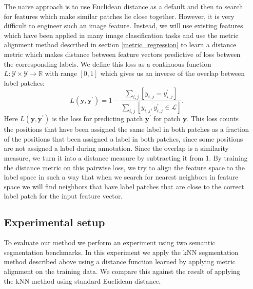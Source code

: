 \documentclass[a4paper,titlepage]{article}
\renewcommand{\vec}[1]{\mathbf{#1}}
\begin{document}
The naive approach is to use Euclidean distance as a default and then to search for features which make similar patches lie close together. However, it is very difficult to engineer such an image feature. Instead, we will use existing features which have been applied in many image classification tasks and use the metric alignment method described in section \ref{metric_regression} to learn a distance metric which makes distance between feature vectors predictive of loss between the corresponding labels. We define this loss as a continuous function $L: \mathcal{Y} \times \mathcal{Y} \rightarrow \mathbb{R}$ with range $[0,1]$ which gives us an inverse of the overlap between label patches:
\begin{equation}
L(\vec{y}, \vec{y}^\prime) = 1 - \frac{\sum_{i,j} \left [ y_{i,j} = y^\prime_{i,j}\right]}{\sum_{i,j} \left [y_{i,j}, y^\prime_{i,j} \in \mathcal{L}\right ]}.
\label{eq:patch_loss}
\end{equation}
Here $L(\vec{y}, \vec{y}^\prime)$ is the loss for predicting patch $\vec{y}^\prime$ for patch $\vec{y}$. This loss counts the positions that have been assigned the same label in both patches as a fraction of the positions that been assigned a label in both patches, since some positions are not assigned a label during annotation. Since the overlap is a similarity measure, we turn it into a distance measure by subtracting it from 1. By training the distance metric on this pairwise loss, we try to align the feature space to the label space in such a way that when we search for nearest neighbors in feature space we will find neighbors that have label patches that are close to the correct label patch for the input feature vector.




\subsection{Experimental setup}

To evaluate our method we perform an experiment using two semantic segmentation benchmarks. In this experiment we apply the \ac{kNN} segmentation method described above using a distance function learned by applying metric alignment on the training data. We compare this against the result of applying the \ac{kNN} method using standard Euclidean distance.
\end{document}
